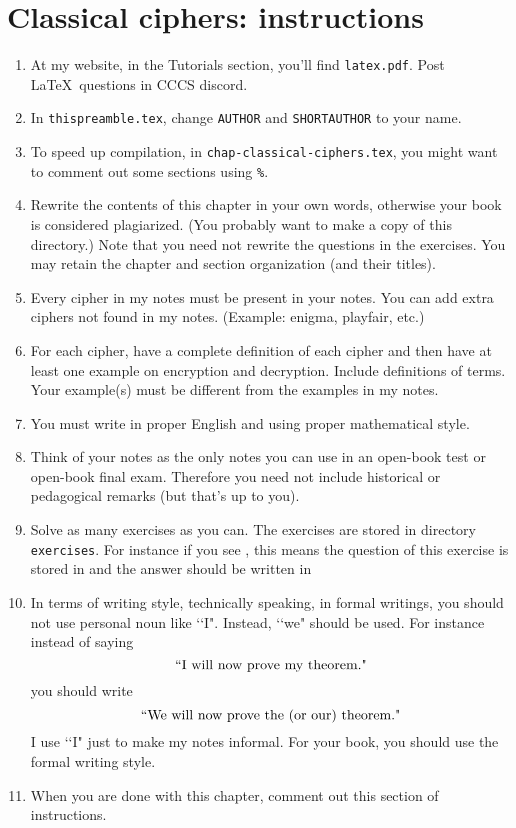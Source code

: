 \section{Classical ciphers: instructions}

\begin{enumerate}
\item
  At my website, in the Tutorials section, you'll find \verb!latex.pdf!.
  Post \LaTeX\ questions in CCCS discord.
\item
  In \verb!thispreamble.tex!, change \verb!AUTHOR! and \verb!SHORTAUTHOR!
  to your name.
\item
  To speed up compilation, in \verb!chap-classical-ciphers.tex!, you
  might want to comment out some sections using \verb!%!.
\item
  Rewrite the contents of this chapter in your own words, otherwise your book
  is considered plagiarized.
  (You probably want to make a copy of this directory.)
  Note that you need not rewrite the questions in the exercises.
  You may retain the chapter and section organization (and their titles).
\item
  Every cipher in my notes must be present in your notes.
  You can add extra ciphers not found in my notes.
  (Example: enigma, playfair, etc.)
\item
  For each cipher, have a complete definition of each cipher
  and then have at least one example on encryption and decryption.
  Include definitions of terms.
  Your example(s) must be different from the examples in my notes.
\item
  You must write in proper English and using proper mathematical style.
\item
  Think of your notes as the only notes you can use in an open-book test or
  open-book final exam.
  Therefore you need not include historical or pedagogical remarks
  (but that's up to you).
\item
  Solve as many exercises as you can.
  The exercises are stored in directory \verb!exercises!.
  For instance if you see \verb!!, this means
  the question of this exercise is stored in
  \verb!!
  and the answer should be written in
  \verb!!
\item
  In terms of writing style, technically speaking, in formal
  writings, you should not use personal noun like \lq\lq I".
  Instead, \lq\lq we" should be used.
  For instance instead of saying
  \[
  \text{\lq\lq I will now prove my theorem."}
  \]
  you should write
  \[
  \text{\lq\lq We will now prove the (or our) theorem."}
  \]
  I use \lq\lq I" just to make my notes informal.
  For your book, you should use the formal writing style.
\item
  When you are done with this chapter, comment out this section of
  instructions.
\end{enumerate}
